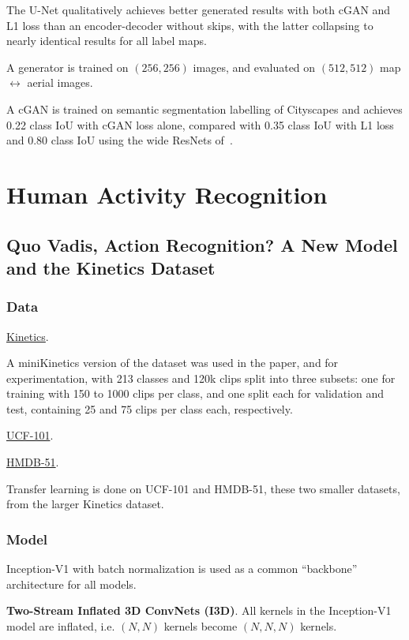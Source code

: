 \documentclass[a4paper, 12pt]{article}
\begin{document}
The U-Net qualitatively achieves better generated results with both cGAN and L1
loss than an encoder-decoder without skips, with the latter collapsing to
nearly identical results for all label maps.

A generator is trained on $(256, 256)$ images, and evaluated on $(512, 512)$
map $\leftrightarrow$ aerial images.

A cGAN is trained on semantic segmentation labelling of
Cityscapes\citet{DBLP:journals/corr/CordtsORREBFRS16} and achieves 0.22 class
IoU with cGAN loss alone, compared with 0.35 class IoU with L1 loss and 0.80
class IoU using the wide ResNets of~\citet{DBLP:journals/corr/WuSH16e}.


\section{Human Activity Recognition}


\subsection{Quo Vadis, Action Recognition? A New Model and the Kinetics
            Dataset\citet{carreira2017quo}}

\subsubsection{Data}

\hyperref[kinetics]{Kinetics}.

A miniKinetics version of the dataset was used in the paper, and for
experimentation, with 213 classes and 120k clips split into three subsets: one
for training with 150 to 1000 clips per class, and one split each for
validation and test, containing 25 and 75 clips per class each, respectively.

\hyperref[ucf101]{UCF-101}.

\hyperref[hmdb51]{HMDB-51}.

Transfer learning is done on UCF-101 and HMDB-51, these two smaller datasets,
from the larger Kinetics dataset.

\subsubsection{Model}

Inception-V1 with batch normalization is used as a common ``backbone''
architecture for all models.

\textbf{Two-Stream Inflated 3D ConvNets (I3D)}. All kernels in the Inception-V1
model are inflated, i.e. $(N, N)$ kernels become $(N, N, N)$ kernels.
\end{document}
